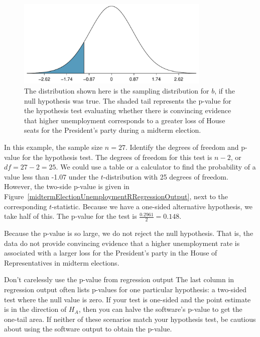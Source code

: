 \begin{figure}
\centering
\includegraphics[width=0.82\textwidth]{ch_regr_simple_linear/figures/oneSidedTailForMidtermUnemploymentHT/oneSidedTailForMidtermUnemploymentHT}
\caption{The distribution shown here is the sampling distribution for $b$, if the null hypothesis was true. The shaded tail represents the p-value for the hypothesis test evaluating whether there is convincing evidence that higher unemployment corresponds to a greater loss of House seats for the President's party during a midterm election.}
\label{oneSidedTailForMidtermUnemploymentHT}
\end{figure}

\begin{examplewrap}
\begin{nexample}{In this example, the sample size $n=27$. Identify the degrees of freedom and p-value for the hypothesis test.}
The degrees of freedom for this test is $n-2$, or $df = 27-2 = 25$. We could use a table or a calculator to find the probability of a value less than -1.07 under the $t$-distribution with 25 degrees of freedom.  However, the two-side p-value is given in Figure~\ref{midtermElectionUnemploymentRRegressionOutput}, next to the corresponding $t$-statistic.  Because we have a one-sided alternative hypothesis, we take half of this.  The p-value for the test is $\frac{0.2961}{2}=0.148$.  
\end{nexample}
\end{examplewrap}

\D{\newpage}

Because the p-value is so large, we do not reject the null hypothesis. That is, the data do not provide convincing evidence that a higher unemployment rate is associated with a larger loss for the President's party in the House of Representatives in midterm elections.


\begin{onebox}{Don't carelessly use the p-value from regression output}
{The last column in regression output often lists p-values for one particular hypothesis: a two-sided test where the null value is zero. If your test is one-sided and the point estimate is in the direction of $H_A$, then you can halve the software's p-value to get the one-tail area. If neither of these scenarios match your hypothesis test, be cautious about using the software output to obtain the p-value.}
\end{onebox}





